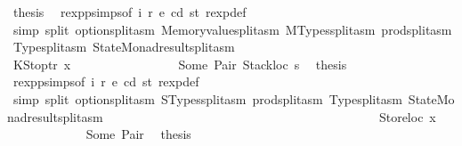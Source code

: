 \begin{isabellebody}
\ {\isacharquery}{\kern0pt}thesis\ \isamarkupfalse%
\ rexp{\isachardot}{\kern0pt}psimps{\isacharparenleft}{\kern0pt}{}{\isacharparenright}{\kern0pt}{\isacharbrackleft}{\kern0pt}of\ i\ r\ e\ cd\ st{\isacharbrackright}{\kern0pt}\ rexp{\isacharunderscore}{\kern0pt}def\ \isamarkupfalse%
\ {\isacharparenleft}{\kern0pt}simp\ split{\isacharcolon}{\kern0pt}\ option{\isachardot}{\kern0pt}split{\isacharunderscore}{\kern0pt}asm\ Memoryvalue{\isachardot}{\kern0pt}split{\isacharunderscore}{\kern0pt}asm\ MTypes{\isachardot}{\kern0pt}split{\isacharunderscore}{\kern0pt}asm\ prod{\isachardot}{\kern0pt}split{\isacharunderscore}{\kern0pt}asm\ Type{\isachardot}{\kern0pt}split{\isacharunderscore}{\kern0pt}asm\ StateMonad{\isachardot}{\kern0pt}result{\isachardot}{\kern0pt}split{\isacharunderscore}{\kern0pt}asm{\isacharparenright}{\kern0pt}\isanewline
\ \ \ \ \ \ \ \ \ \ \ \ \isamarkupfalse%
\isanewline
\ \ \ \ \ \ \ \ \ \ \ \ \ \ \isamarkupfalse%
\ {\isacharparenleft}{\kern0pt}KStoptr\ x{}{\isacharparenright}{\kern0pt}\isanewline
\ \ \ \ \ \ \ \ \ \ \ \ \ \ \isamarkupfalse%
\ {}{}\ Some\ Pair\ Stackloc\ s{}\ \isamarkupfalse%
\ {\isacharquery}{\kern0pt}thesis\ \isamarkupfalse%
\ rexp{\isachardot}{\kern0pt}psimps{\isacharparenleft}{\kern0pt}{}{\isacharparenright}{\kern0pt}{\isacharbrackleft}{\kern0pt}of\ i\ r\ e\ cd\ st{\isacharbrackright}{\kern0pt}\ rexp{\isacharunderscore}{\kern0pt}def\ \isamarkupfalse%
\ {\isacharparenleft}{\kern0pt}simp\ split{\isacharcolon}{\kern0pt}\ option{\isachardot}{\kern0pt}split{\isacharunderscore}{\kern0pt}asm\ STypes{\isachardot}{\kern0pt}split{\isacharunderscore}{\kern0pt}asm\ prod{\isachardot}{\kern0pt}split{\isacharunderscore}{\kern0pt}asm\ Type{\isachardot}{\kern0pt}split{\isacharunderscore}{\kern0pt}asm\ StateMonad{\isachardot}{\kern0pt}result{\isachardot}{\kern0pt}split{\isacharunderscore}{\kern0pt}asm{\isacharparenright}{\kern0pt}\isanewline
\ \ \ \ \ \ \ \ \ \ \ \ \isamarkupfalse%
\isanewline
\ \ \ \ \ \ \ \ \ \ \isamarkupfalse%
\isanewline
\ \ \ \ \ \ \ \ \isamarkupfalse%
\isanewline
\ \ \ \ \ \ \ \ \ \ \isamarkupfalse%
\ {\isacharparenleft}{\kern0pt}Storeloc\ x{}{\isacharparenright}{\kern0pt}\isanewline
\ \ \ \ \ \ \ \ \ \ \isamarkupfalse%
\ {}{}\ Some\ Pair\ \isamarkupfalse%
\ {\isacharquery}{\kern0pt}thesis\ \isamarkupfalse%

\end{isabellebody}
